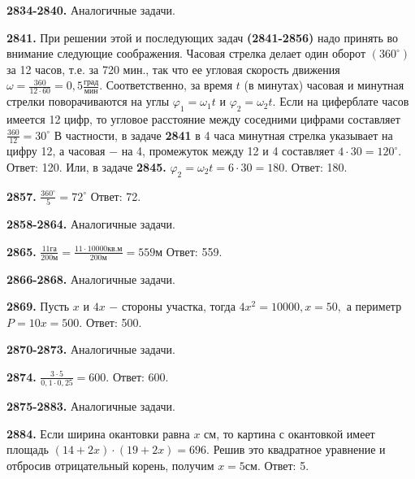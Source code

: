 \textbf{2834-2840.} Аналогичные задачи.

\textbf{2841.} При решении этой и последующих задач \textbf{(2841-2856)} надо принять во внимание следующие соображения. Часовая стрелка делает один оборот $(360^\circ)$ за 12 часов, т.е. за 720 мин., так что  ее угловая скорость движения $\omega=\frac{360}{12\cdot60}=0,5\frac{\text{град}}{\text{мин}}.$ Соответственно, за время $t$ (в минутах) часовая и минутная стрелки поворачиваются на углы $\varphi_1=\omega_1t$ и $\varphi_2=\omega_2t$. Если на циферблате часов имеется 12 цифр, то угловое расстояние между соседними цифрами составляет $\frac{360}{12}=30^\circ$
В частности, в задаче \textbf{2841} в 4 часа минутная стрелка указывает на цифру 12, а часовая $-$ на 4, промежуток между 12 и 4 составляет $4\cdot30=120^\circ$. \newline \null \hspace*{\fill} Ответ: 120. \newline
Или, в задаче \textbf{2845.} $\varphi_2=\omega_2t=6\cdot30=180.$ \newline \null \hspace*{\fill} Ответ: 180. 

\textbf{2857.} $\frac{360^\circ}{5}=72^\circ$ \newline \null \hspace*{\fill} Ответ: 72. 

\textbf{2858-2864.} Аналогичные задачи.

\textbf{2865.} $\frac{11\text{га}}{200\text{м}}=\frac{11\cdot10000\text{кв.м}}{200\text{м}}=559\text{м}$ \newline \null \hspace*{\fill} Ответ: 559. 

\textbf{2866-2868.} Аналогичные задачи.

\textbf{2869.} Пусть $x$ и $4x$ $-$ стороны участка, тогда $4x^2=10000, x=50,$ а периметр $P = 10x = 500.$ \newline \null \hspace*{\fill}Ответ: 500.

\textbf{2870-2873.} Аналогичные задачи.

\textbf{2874.} $\frac{3\cdot5}{0,1\cdot0,25}=600.$ \newline \null \hspace*{\fill} Ответ: 600. 

\textbf{2875-2883.} Аналогичные задачи.

\textbf{2884.} Если ширина окантовки равна $x$ см, то картина с окантовкой имеет площадь $(14+2x)\cdot(19+2x)=696.$ Решив это квадратное уравнение и отбросив отрицательный корень, получим $x=5\text{см}.$ \newline \null \hspace*{\fill} Ответ: 5. 

